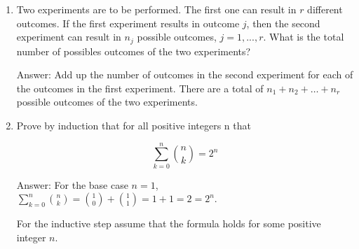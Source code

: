 \documentclass{article}
\begin{document}
\begin{enumerate}
\begin{enumerate}
\begin{enumerate}
\begin{itemize}
\item If two of the letters are the same there are $\binom{2}{1}\binom{4}{3}5!/2! = 480$ words possible. 

\item If four of the letters are the same there are $\binom{2}{2}\binom{3}{1}5!/(2!2!) = 90$ words possible.
\end{itemize}

\item 6 letters: 1260 words possible.
\begin{itemize}
\item If two of the letters are the same there are $\binom{2}{1}\binom{4}{4}6! / 2! = 720$ words possible.
\item If four of the letters are the same there are $\binom{2}{2}\binom{3}{2}6!/(2!2!) = 540$ words possible. 
\end{itemize} 

\item 7 letters: 1260 words possible (by part a).
\end{enumerate}

{\bf Final result:} adding up the numbers from (i) through (vii) conclude that 3591 words can be built. 
\end{enumerate} 


\item Two experiments are to be performed. The first one can result in $r$ different outcomes.
If the first experiment results in outcome $j$, then the second experiment can result in $n_j$ possible outcomes, $j = 1, . . . , r$. What is the total number of possibles outcomes of the two experiments?

Answer: Add up the number of outcomes in the second experiment for each of the outcomes in the first experiment. There are a total of $n_1 + n_2 + \dots + n_r$ possible outcomes of the two experiments. 


\item Prove by induction that for all positive integers n that

$$
\sum_{k=0}^n \binom{n}{k} = 2^n
$$

Answer: For the base case $n=1$, $\sum_{k=0}^n \binom{n}{k} =\binom{1}{0} + \binom{1}{1}  = 1 + 1 = 2 = 2^n$.

For the inductive step assume that the formula holds for some positive integer $n$.


\end{enumerate}
\end{document}
